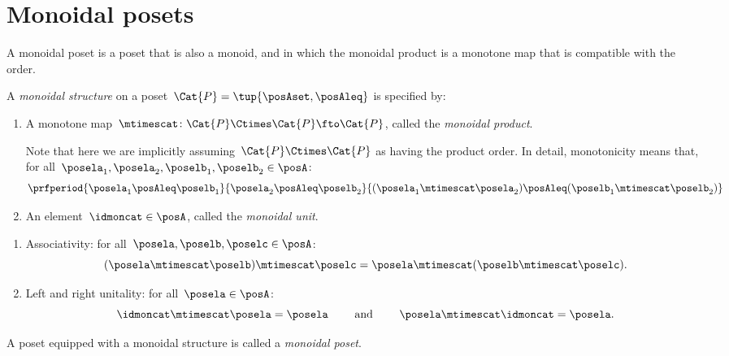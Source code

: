 
\section{Monoidal posets}
\label{sec:monoidal-posets}


A monoidal poset is a poset that is also a monoid, and in which the monoidal product is a monotone map that is compatible with the order.



\begin{ctdefinition}
    \label{def:monoidal-poset}
    A \emph{monoidal structure} on a poset~$\Cat{P} = \tup{\posAset, \posAleq}$ is specified by:

    \constit
    \begin{enumerate}
        \item A monotone map~$\mtimescat \colon \Cat{P} \Ctimes \Cat{P} \fto \Cat{P}$, called the \emph{monoidal product}.

              \noindent
              Note that here we are implicitly assuming~$\Cat{P} \Ctimes \Cat{P}$ as having the product order.
              In detail, monotonicity means that, for all~$\posela_1, \posela_2, \poselb_1, \poselb_2 \in \posA$:
              \begin{equation}
                  \prfperiod{\posela_1 \posAleq \poselb_1}{\posela_2 \posAleq \poselb_2}{ (\posela_1 \mtimescat  \posela_2) \posAleq  (\poselb_1 \mtimescat  \poselb_2)}
              \end{equation}
        \item An element~$\idmoncat \in \posA$, called the \emph{monoidal unit}.
    \end{enumerate}

    \condit
    \begin{enumerate}
        \item Associativity: for all~$\posela, \poselb, \poselc \in \posA$:
              \begin{equation}
                  (\posela \mtimescat \poselb)
                  \mtimescat \poselc =  \posela  \mtimescat ( \poselb \mtimescat \poselc).
              \end{equation}
        \item Left and right unitality: for all~$\posela \in \posA$:
              \begin{equation}
                  \idmoncat \mtimescat \posela = \posela \quad \quad \text{ and } \quad \quad \posela \mtimescat \idmoncat = \posela.
              \end{equation}
    \end{enumerate}

    \noindent A poset equipped with a monoidal structure is called a \emph{monoidal poset}.
\end{ctdefinition}

